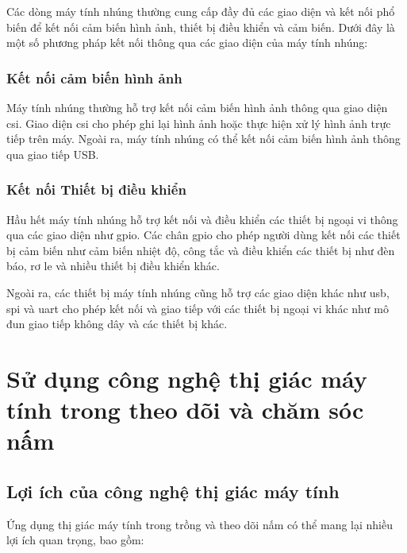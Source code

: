 Các dòng máy tính nhúng thường cung cấp đầy đủ các giao diện và kết nối phổ biến để kết nối cảm biến hình ảnh, thiết bị điều khiển và cảm biến. Dưới đây là một số phương pháp kết nối thông qua các giao diện của máy tính nhúng:

\subsubsection{Kết nối cảm biến hình ảnh}
Máy tính nhúng thường hỗ trợ kết nối cảm biến hình ảnh thông qua giao diện \acrfull{csi}. Giao diện \acrshort{csi} cho phép ghi lại hình ảnh hoặc thực hiện xử lý hình ảnh trực tiếp trên máy. Ngoài ra, máy tính nhúng có thể kết nối cảm biến hình ảnh thông qua giao tiếp USB.

\subsubsection{Kết nối Thiết bị điều khiển}
Hầu hết máy tính nhúng hỗ trợ kết nối và điều khiển các thiết bị ngoại vi thông qua các giao diện như \acrfull{gpio}. Các chân \acrshort{gpio} cho phép người dùng kết nối các thiết bị cảm biến như cảm biến nhiệt độ, công tắc và điều khiển các thiết bị như đèn báo, rơ le và nhiều thiết bị điều khiển khác.

Ngoài ra, các thiết bị máy tính nhúng cũng hỗ trợ các giao diện khác như \acrfull{usb}, \acrfull{spi} và \acrfull{uart} cho phép kết nối và giao tiếp với các thiết bị ngoại vi khác như mô đun giao tiếp không dây và các thiết bị khác.

\section{Sử dụng công nghệ thị giác máy tính trong theo dõi và chăm sóc nấm}

\subsection{Lợi ích của công nghệ thị giác máy tính}

Ứng dụng thị giác máy tính trong trồng và theo dõi nấm có thể mang lại nhiều lợi ích quan trọng, bao gồm:

